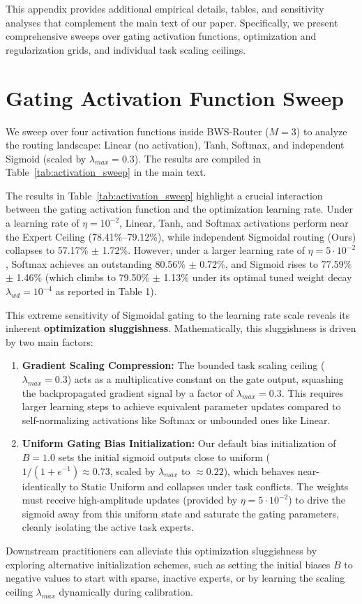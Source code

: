 \onecolumn
{}

This appendix provides additional empirical details, tables, and sensitivity analyses that complement the main text of our paper. Specifically, we present comprehensive sweeps over gating activation functions, optimization and regularization grids, and individual task scaling ceilings.

\section{Gating Activation Function Sweep}
\label{app:activation_sweep}
We sweep over four activation functions inside BWS-Router ($M=3$) to analyze the routing landscape: Linear (no activation), Tanh, Softmax, and independent Sigmoid (scaled by $\lambda_{max} = 0.3$). The results are compiled in Table~\ref{tab:activation_sweep} in the main text.

The results in Table~\ref{tab:activation_sweep} highlight a crucial interaction between the gating activation function and the optimization learning rate. Under a learning rate of $\eta = 10^{-2}$, Linear, Tanh, and Softmax activations perform near the Expert Ceiling (78.41\%--79.12\%), while independent Sigmoidal routing (Ours) collapses to 57.17\% $\pm$ 1.72\%. However, under a larger learning rate of $\eta = 5 \cdot 10^{-2}$, Softmax achieves an outstanding 80.56\% $\pm$ 0.72\%, and Sigmoid rises to 77.59\% $\pm$ 1.46\% (which climbs to 79.50\% $\pm$ 1.13\% under its optimal tuned weight decay $\lambda_{wd} = 10^{-4}$ as reported in Table 1).

This extreme sensitivity of Sigmoidal gating to the learning rate scale reveals its inherent \textbf{optimization sluggishness}. Mathematically, this sluggishness is driven by two main factors:
\begin{enumerate}
    \item \textbf{Gradient Scaling Compression:} The bounded task scaling ceiling ($\lambda_{max} = 0.3$) acts as a multiplicative constant on the gate output, squashing the backpropagated gradient signal by a factor of $\lambda_{max} = 0.3$. This requires larger learning steps to achieve equivalent parameter updates compared to self-normalizing activations like Softmax or unbounded ones like Linear.
    \item \textbf{Uniform Gating Bias Initialization:} Our default bias initialization of $B = 1.0$ sets the initial sigmoid outputs close to uniform ($1 / (1 + e^{-1}) \approx 0.73$, scaled by $\lambda_{max}$ to $\approx 0.22$), which behaves near-identically to Static Uniform and collapses under task conflicts. The weights must receive high-amplitude updates (provided by $\eta = 5 \cdot 10^{-2}$) to drive the sigmoid away from this uniform state and saturate the gating parameters, cleanly isolating the active task experts.
\end{enumerate}
Downstream practitioners can alleviate this optimization sluggishness by exploring alternative initialization schemes, such as setting the initial biases $B$ to negative values to start with sparse, inactive experts, or by learning the scaling ceiling $\lambda_{max}$ dynamically during calibration.

